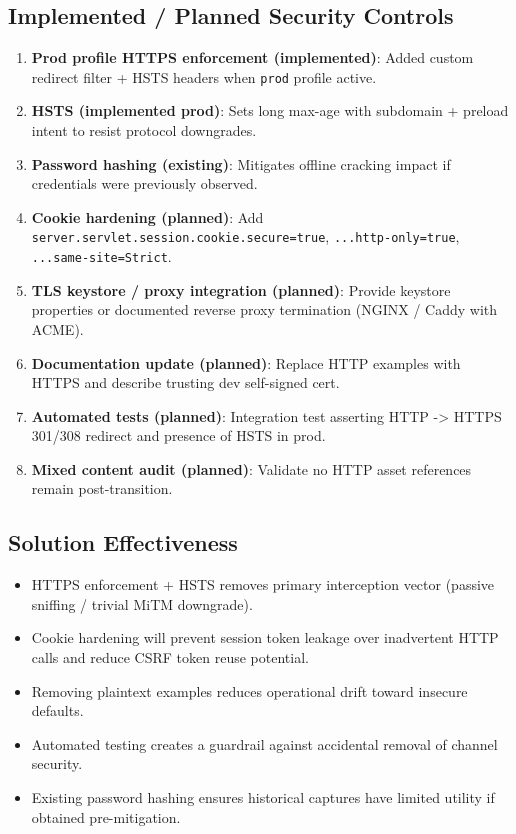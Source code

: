 \documentclass[]{UCD_CS_FYP_Report}
\begin{document}
\subsection*{Implemented / Planned Security Controls}
\begin{enumerate}
	\item \textbf{Prod profile HTTPS enforcement (implemented)}: Added custom redirect filter + HSTS headers when \texttt{prod} profile active.
	\item \textbf{HSTS (implemented prod)}: Sets long max-age with subdomain + preload intent to resist protocol downgrades.
	\item \textbf{Password hashing (existing)}: Mitigates offline cracking impact if credentials were previously observed.
	\item \textbf{Cookie hardening (planned)}: Add \texttt{server.servlet.session.cookie.secure=true}, \texttt{...http-only=true}, \texttt{...same-site=Strict}.
	\item \textbf{TLS keystore / proxy integration (planned)}: Provide keystore properties or documented reverse proxy termination (NGINX / Caddy with ACME).
	\item \textbf{Documentation update (planned)}: Replace HTTP examples with HTTPS and describe trusting dev self-signed cert.
	\item \textbf{Automated tests (planned)}: Integration test asserting HTTP -> HTTPS 301/308 redirect and presence of HSTS in prod.
	\item \textbf{Mixed content audit (planned)}: Validate no HTTP asset references remain post-transition.
\end{enumerate}

\subsection*{Solution Effectiveness}
\begin{itemize}
	\item HTTPS enforcement + HSTS removes primary interception vector (passive sniffing / trivial MiTM downgrade).
	\item Cookie hardening will prevent session token leakage over inadvertent HTTP calls and reduce CSRF token reuse potential.
	\item Removing plaintext examples reduces operational drift toward insecure defaults.
	\item Automated testing creates a guardrail against accidental removal of channel security.
	\item Existing password hashing ensures historical captures have limited utility if obtained pre-mitigation.
\end{itemize}
\end{document}
